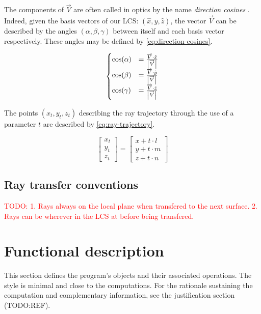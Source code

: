 The components of $\overrightarrow{V}$ are often called in optics by the name
\emph{direction cosines} \cite{mathworld:direction-cosine}. Indeed, given the
basis vectors of our \gls{LCS}: $(\hat{x}, \hat{y}, \hat{z})$, the vector
$\overrightarrow{V}$ can be described by the angles $(\alpha, \beta, \gamma)$
between itself and each basis vector respectively. These angles may be defined
by \cref{eq:direction-cosines}.

\begin{equation} \label{eq:direction-cosines}
\begin{cases}
\cos(\alpha) &= \frac{\overrightarrow{V} \cdot \hat{x}}
                     {\abs{\overrightarrow{V}}} \\
\cos(\beta) &= \frac{\overrightarrow{V} \cdot \hat{y}}
                    {\abs{\overrightarrow{V}}} \\
\cos(\gamma) &= \frac{\overrightarrow{V} \cdot \hat{z}}
                     {\abs{\overrightarrow{V}}}
\end{cases}
\end{equation}

The points $(x_t, y_t, z_t)$ describing the ray trajectory through the use of a parameter $t$
are described by \cref{eq:ray-trajectory}.

\begin{equation} \label{eq:ray-trajectory}
\begin{bmatrix}
x_t \\ y_t \\ z_t
\end{bmatrix} =
\begin{bmatrix}
x + t \cdot l \\
y + t \cdot m \\
z + t \cdot n
\end{bmatrix}
\end{equation}

\subsection{Ray transfer conventions}
\textcolor{red}{TODO:
1. Rays always on the local plane when transfered to the next surface.
2. Rays can be wherever in the LCS at before being transfered.}

\section{Functional description}
This section defines the program's objects and their associated
operations. The style is minimal and close to the computations. For
the rationale sustaining the computation and complementary information,
see the justification section (TODO:REF).

